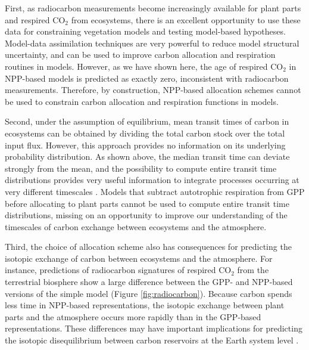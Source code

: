 \documentclass[12pt, a4paper]{article}
\begin{document}
First, as radiocarbon measurements become increasingly available for plant parts and respired CO$_2$ from ecosystems, there is an excellent opportunity to use these data for constraining vegetation models and testing model-based hypotheses. Model-data assimilation techniques are very powerful to reduce model structural uncertainty, and can be used to improve carbon allocation and respiration routines in models.  However, as we have shown here, the age of respired CO$_2$ in NPP-based models is predicted as exactly zero, inconsistent with radiocarbon measurements. Therefore, by construction, NPP-based allocation schemes cannot be used to constrain carbon allocation and respiration functions in models. 


Second, under the assumption of equilibrium, mean transit times of carbon in ecosystems can be obtained by dividing the total carbon stock over the total input flux. However, this approach provides no information on its underlying probability distribution. As shown above, the median transit time can deviate strongly from the mean, and the possibility to compute entire transit time distributions provides very useful information to integrate processes occurring at very different timescales \citep{Sierra2021JE}. Models that subtract autotrophic respiration from GPP before allocating to plant parts cannot be used to compute entire transit time distributions, missing on an opportunity to improve our understanding of the timescales of carbon exchange between ecosystems and the atmosphere. 

Third, the choice of allocation scheme also has consequences for predicting the isotopic exchange of carbon between ecosystems and the atmosphere. For instance, predictions of radiocarbon signatures of respired CO$_2$ from the terrestrial biosphere show a large difference between the GPP- and NPP-based versions of the simple model (Figure \ref{fig:radiocarbon}). Because carbon spends less time in NPP-based representations, the isotopic exchange between plant parts and the atmosphere occurs more rapidly than in the GPP-based representations.
These differences may have important implications for predicting the isotopic disequilibrium between carbon reservoirs at the Earth system level \citep{Randerson2002, Levin2021}. 
\end{document}
